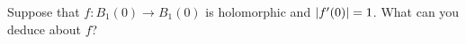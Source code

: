 \documentclass{homework}
\begin{document}
                                                                                                                                                                                                                                                                          \begin{problem}\label{schwarz-lemma-3}Suppose that
                                                                                                                                                                                                                                                                            $f : B_1(0) \to B_1(0)$ is holomorphic and $\left|f'(0)\right| = 1$.  What
                                                                                                                                                                                                                                                                              can you deduce about $f$?
                                                                                                                                                                                                                                                                              \end{problem}
\end{document}

